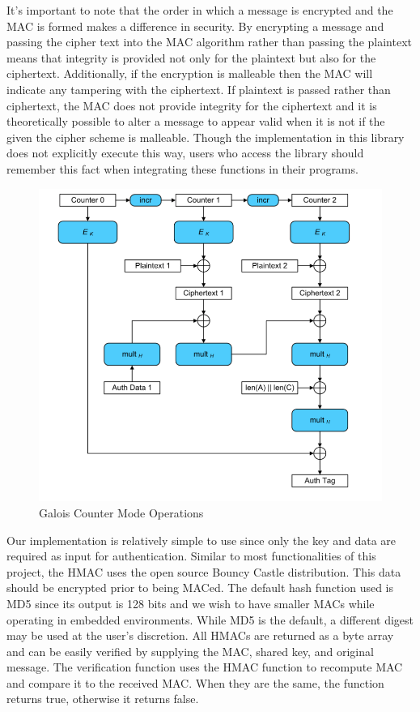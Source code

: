 It's important to note that the order in which a message is encrypted and the MAC is formed makes a difference in security. By encrypting a message and passing the cipher text into the MAC algorithm rather than passing the plaintext means that integrity is provided not only for the plaintext but also for the ciphertext. Additionally, if the encryption is malleable then the MAC will indicate any tampering with the ciphertext. If plaintext is passed rather than ciphertext, the MAC does not provide integrity for the ciphertext and it is theoretically possible to alter a message to appear valid when it is not if the given the cipher scheme is malleable. Though the implementation in this library does not explicitly execute this way, users who access the library should remember this fact when integrating these functions in their programs.

 \begin{figure}[t]
	\centering
	\includegraphics[width=12cm,height=0.7\textheight,keepaspectratio]{./figures/figure_6}
	\center\caption[font=footnote]{Galois Counter Mode Operations}
\end{figure}

Our implementation is relatively simple to use since only the key and data are required as input for authentication. Similar to most functionalities of this project, the HMAC uses the open source Bouncy Castle distribution. This data should be encrypted prior to being MACed. The  default hash function used is MD5 since its output is 128 bits and we wish to have smaller MACs while operating in embedded environments. While MD5 is the default, a different digest may be used at the user's discretion. All HMACs are returned as a byte array and can be easily verified by supplying the MAC, shared key, and original message. The verification function uses the HMAC function to recompute MAC and compare it to the received MAC. When they are the same, the function returns true, otherwise it returns false. 

